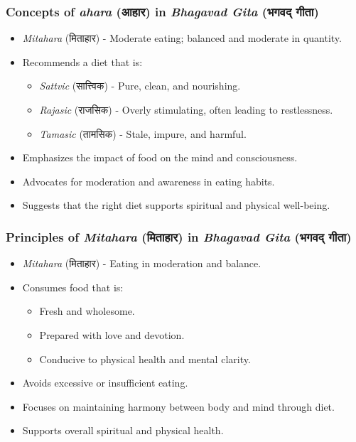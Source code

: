 \begin{frame}[fragile]\frametitle{Concepts of \textit{ahara} (आहार) in \textit{Bhagavad Gita} (भगवद् गीता)}

      \begin{itemize}
		\item \textit{Mitahara} (मिताहार) - Moderate eating; balanced and moderate in quantity.
		\item Recommends a diet that is:
		  \begin{itemize}
		      \item \textit{Sattvic} (सात्त्विक) - Pure, clean, and nourishing.
		      \item \textit{Rajasic} (राजसिक) - Overly stimulating, often leading to restlessness.
		      \item \textit{Tamasic} (तामसिक) - Stale, impure, and harmful.
		  \end{itemize}
		\item Emphasizes the impact of food on the mind and consciousness.
		\item Advocates for moderation and awareness in eating habits.
		\item Suggests that the right diet supports spiritual and physical well-being.
	  \end{itemize}

\end{frame}


\begin{frame}[fragile]\frametitle{Principles of \textit{Mitahara} (मिताहार) in \textit{Bhagavad Gita} (भगवद् गीता)}

      \begin{itemize}
		\item \textit{Mitahara} (मिताहार) - Eating in moderation and balance.
		\item Consumes food that is:
		  \begin{itemize}
		      \item Fresh and wholesome.
		      \item Prepared with love and devotion.
		      \item Conducive to physical health and mental clarity.
		  \end{itemize}
		\item Avoids excessive or insufficient eating.
		\item Focuses on maintaining harmony between body and mind through diet.
		\item Supports overall spiritual and physical health.
	  \end{itemize}

\end{frame}

